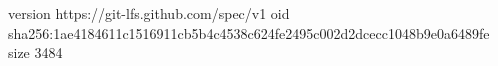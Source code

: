 version https://git-lfs.github.com/spec/v1
oid sha256:1ae4184611c1516911cb5b4c4538c624fe2495c002d2dcecc1048b9e0a6489fe
size 3484
